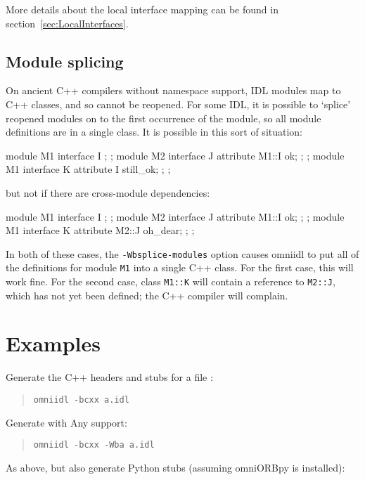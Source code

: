 \documentclass[11pt,twoside,a4paper]{book}
\newcommand{\type}[1]{\texttt{#1}}
\newcommand{\intf}[1]{\texttt{#1}}
\newcommand{\cmdline}[1]{\texttt{#1}}
\newcommand{\file}{\begingroup \urlstyle{tt}\Url}
\begin{document}
More details about the local interface mapping can be found in
section~\ref{sec:LocalInterfaces}.


\subsection{Module splicing}

On ancient C++ compilers without namespace support, IDL modules map to
C++ classes, and so cannot be reopened. For some IDL, it is possible
to `splice' reopened modules on to the first occurrence of the module,
so all module definitions are in a single class. It is possible in
this sort of situation:

\begin{idllisting}
module M1 {
  interface I {};
};
module M2 {
  interface J {
    attribute M1::I ok;
  };
};
module M1 {
  interface K {
    attribute I still_ok;
  };
};
\end{idllisting}

\noindent but not if there are cross-module dependencies:

\begin{idllisting}
module M1 {
  interface I {};
};
module M2 {
  interface J {
    attribute M1::I ok;
  };
};
module M1 {
  interface K {
    attribute M2::J oh_dear;
  };
};
\end{idllisting}

\noindent In both of these cases, the \cmdline{-Wbsplice-modules}
option causes omniidl to put all of the definitions for module
\intf{M1} into a single C++ class. For the first case, this will work
fine. For the second case, class \type{M1::K} will contain a reference
to \type{M2::J}, which has not yet been defined; the C++ compiler will
complain.


\section{Examples}

Generate the C++ headers and stubs for a file \file{a.idl}:

\begin{quote}
\cmdline{omniidl -bcxx a.idl}
\end{quote}

\noindent Generate with Any support:

\begin{quote}
\cmdline{omniidl -bcxx -Wba a.idl}
\end{quote}

\noindent As above, but also generate Python stubs (assuming omniORBpy
is installed):
\end{document}

